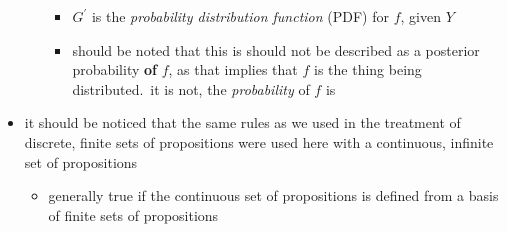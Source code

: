 \documentclass[../jaynes_prob_theory_notes.tex]{subfiles}
\begin{document}
\begin{itemize}
\begin{itemize}
                    \begin{itemize}
                        \item $G^{\prime}$ is the \textit{probability distribution function} (PDF) for $f$, given $Y$
                        \item should be noted that this is should not be described as a posterior probability \textbf{of} $f$, as that implies that $f$ is the thing being distributed.\ it is not, the \textit{probability} of $f$ is
                    \end{itemize}
            \end{itemize}
        \item it should be noticed that the same rules as we used in the treatment of discrete, finite sets of propositions were used here with a continuous, infinite set of propositions
            \begin{itemize}
                \item generally true if the continuous set of propositions is defined from a basis of finite sets of propositions
            \end{itemize}
    \end{itemize}
\end{document}
